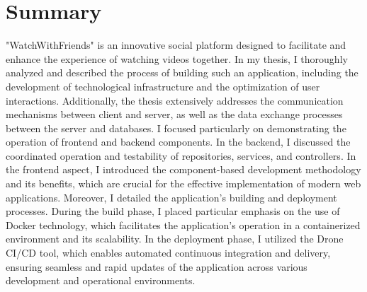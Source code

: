 \chapter{Summary}
"WatchWithFriends" is an innovative social platform designed to facilitate and enhance the experience of watching videos together. In my thesis, I thoroughly analyzed and described the process of building such an application, including the development of technological infrastructure and the optimization of user interactions.
Additionally, the thesis extensively addresses the communication mechanisms between client and server, as well as the data exchange processes between the server and databases. I focused particularly on demonstrating the operation of frontend and backend components. In the backend, I discussed the coordinated operation and testability of repositories, services, and controllers. In the frontend aspect, I introduced the component-based development methodology and its benefits, which are crucial for the effective implementation of modern web applications.
Moreover, I detailed the application's building and deployment processes. During the build phase, I placed particular emphasis on the use of Docker technology, which facilitates the application's operation in a containerized environment and its scalability. In the deployment phase, I utilized the Drone CI/CD tool, which enables automated continuous integration and delivery, ensuring seamless and rapid updates of the application across various development and operational environments.